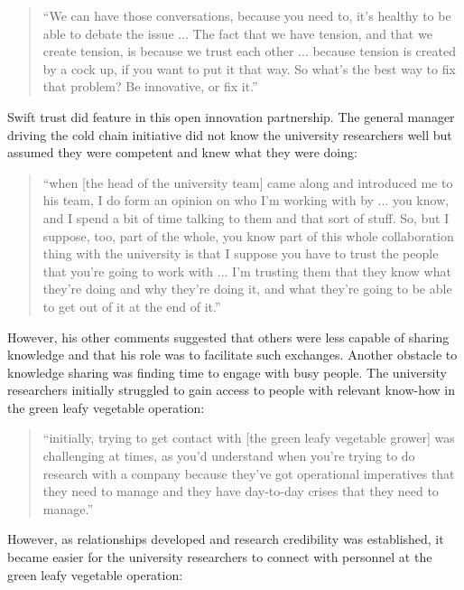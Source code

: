 \begin{quote}
\small
\enquote{We can have those conversations, because you need to, it's healthy to be able to debate the issue ... The fact that we have tension, and that we create tension, is because we trust each other ... because tension is created by a cock up, if you want to put it that way. So what's the best way to fix that problem? Be innovative, or fix it.} \\
\end{quote}

Swift trust did feature in this open innovation partnership. The general manager driving the cold chain initiative did not know the university researchers well but assumed they were competent and knew what they were doing:

\begin{quote}
\small
\enquote{when [the head of the university team] came along and introduced me to his team, I do form an opinion on who I'm working with by ... you know, and I spend a bit of time talking to them and that sort of stuff. So, but I suppose, too, part of the whole, you know part of this whole collaboration thing with the university is that I suppose you have to trust the people that you’re going to work with ... I'm trusting them that they know what they're doing and why they're doing it, and what they're going to be able to get out of it at the end of it.} \\
\end{quote}
 
However, his other comments suggested that others were less capable of sharing knowledge and that his role was to facilitate such exchanges. Another obstacle to knowledge sharing was finding time to engage with busy people. The university researchers initially struggled to gain access to people with relevant know-how in the green leafy vegetable operation:   

\begin{quote}
\small
\enquote{initially, trying to get contact with [the green leafy vegetable grower] was challenging at times, as you'd understand when you're trying to do research with a company because they've got operational imperatives that they need to manage and they have day-to-day crises that they need to manage.} \\
\end{quote}

However, as relationships developed and research credibility was established, it became easier for the university researchers to connect with personnel at the green leafy vegetable operation:

